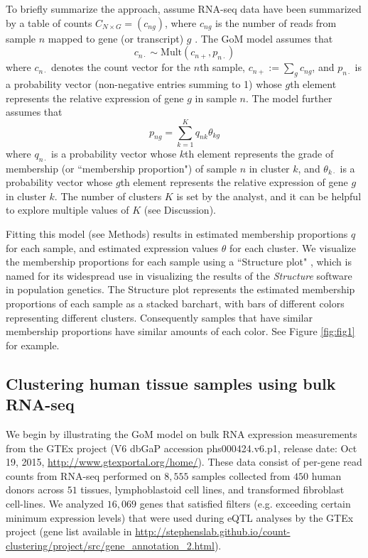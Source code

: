 To briefly summarize the approach, assume RNA-seq data have been summarized by a table of counts $C_{N \times G} = (c_{ng})$, where $c_{ng}$ is the number of reads from sample $n$ mapped to gene (or transcript) $g$ \cite{Oshlack2010}.  The GoM model assumes that 
\begin{equation} \label{eqn:mult}
c_{n\cdot} \sim \text{Mult}(c_{n+}, p_{n\cdot})
\end{equation}
where $c_{n\cdot}$ denotes the count vector for the $n$th sample, $c_{n+} := \sum_g c_{ng}$, and $p_{n\cdot}$ is a probability vector (non-negative entries summing to 1) whose $g$th element represents the relative expression of gene $g$ in sample $n$. 
The model further assumes that 
\begin{equation} \label{eqn:gom}
p_{ng} = \sum_{k=1}^{K} q_{nk}\theta_{kg}    
\end{equation}
where $q_{n\cdot}$ is a probability vector whose $k$th element represents the grade of membership (or ``membership proportion") of
sample $n$ in cluster $k$, and $\theta_{k\cdot}$ is a probability vector whose $g$th element represents
the relative expression of gene $g$ in cluster $k$. The number of clusters $K$ is set by the analyst, and it can be helpful to explore multiple
values of $K$ (see Discussion).

Fitting this model (see Methods) results in estimated membership proportions $q$ for each sample, and estimated expression values $\theta$ for each cluster.
We visualize the membership proportions for each sample using a ``Structure plot" \cite{Rosenberg2002}, 
which is named for its widespread use in visualizing the
results of the {\it Structure} software \cite{Pritchard2000} in population genetics.
The Structure plot represents the estimated membership proportions of each sample 
as a stacked barchart, with bars of different colors representing  different clusters. Consequently samples that have similar membership proportions have
similar amounts of each color. See Figure \ref{fig:fig1} for example.

\subsection{Clustering human tissue samples using bulk RNA-seq}

We begin by illustrating the GoM model on bulk RNA expression measurements from the GTEx project (V6 dbGaP accession phs000424.v6.p1, release date: Oct 19, 2015, \url{http://www.gtexportal.org/home/}).  These data consist of per-gene read counts from RNA-seq performed on $8,555$ samples collected from $450$ human donors across $51$ tissues, lymphoblastoid cell lines, and transformed fibroblast cell-lines. We analyzed $16,069$ genes that satisfied filters (e.g. exceeding certain minimum expression levels) that were used during eQTL analyses by the GTEx project (gene list available in \url{http://stephenslab.github.io/count-clustering/project/src/gene_annotation_2.html}). 


